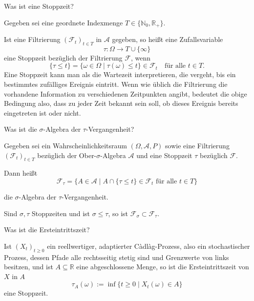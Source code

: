 \begin{QandA}
    \item Was ist eine Stoppzeit?
    \begin{answered}
        Gegeben sei eine geordnete Indexmenge $T \in \{\mathbb{N}_0, \mathbb{R}_+ \}$.

        Ist eine Filtrierung $({\mathcal{F}}_{t})_{t\in T}$ in $\mathcal{A}$ gegeben, so heißt eine Zufallsvariable
        \[
            \tau : \Omega \to T \cup \{\infty \}
        \]
        eine Stoppzeit bezüglich der Filtrierung $\mathcal{F}$, wenn
        \[
            \{\tau \leq t \} = \{\omega \in \Omega \mid \tau(\omega) \leq t \} \in \mathcal{F}_t \quad \text{für alle } t \in T.
        \]
        Eine Stoppzeit kann man als die Wartezeit interpretieren, die vergeht, bis ein bestimmtes zufälliges Ereignis eintritt.
        Wenn wie üblich die Filtrierung die vorhandene Information zu verschiedenen Zeitpunkten angibt, bedeutet die obige Bedingung also, dass zu jeder Zeit bekannt sein soll, ob dieses Ereignis bereits eingetreten ist oder nicht.
    \end{answered}

    \item Was ist die $\sigma$-Algebra der $\tau$-Vergangenheit?
    \begin{answered}
        Gegeben sei ein Wahrscheinlichkeitsraum $(\Omega ,{\mathcal{A}},P)$ sowie eine Filtrierung $({\mathcal{F}}_{t})_{t\in T}$ bezüglich der Ober-$\sigma$-Algebra $\mathcal{A}$ und eine Stoppzeit $\tau$ bezüglich $\mathcal{F}$.

        Dann heißt
        \[
            \mathcal{F}_{\tau} = \{A\in{\mathcal{A}} \mid A\cap \{\tau \leq t\}\in{\mathcal{F}}_{t}{\text{ für alle }}t\in T\}
        \]

        die $\sigma$-Algebra der $\tau$-Vergangenheit.

        Sind $\sigma ,\tau$ Stoppzeiten und ist $\sigma \leq \tau$, so ist $\mathcal{F}_{\sigma }\subset{\mathcal{F}}_{\tau }$.
    \end{answered}

    \item Was ist die Ersteintrittszeit?
    \begin{answered}
        Ist $(X_{t})_{t\geq 0}$ ein reellwertiger, adaptierter Càdlàg-Prozess, also ein stochastischer Prozess, dessen Pfade alle rechtsseitig stetig sind und Grenzwerte von links besitzen, und ist $A\subseteq \mathbb{R}$ eine abgeschlossene Menge, so ist die Ersteintrittszeit von $X$ in $A$
        \[
            \tau_{A}(\omega ):=\inf\{t\geq 0 \mid X_{t}(\omega )\in A\}
        \]
        eine Stoppzeit.
    \end{answered}


\end{QandA}

